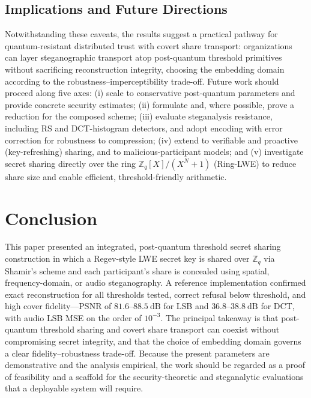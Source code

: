 \documentclass[preprint,12pt,number]{elsarticle}
\begin{document}
\subsection{Implications and Future Directions}

Notwithstanding these caveats, the results suggest a practical pathway for
quantum-resistant distributed trust with covert share transport: organizations
can layer steganographic transport atop post-quantum threshold primitives
without sacrificing reconstruction integrity, choosing the embedding domain
according to the robustness--imperceptibility trade-off. Future work should
proceed along five axes: (i) scale to conservative post-quantum parameters and
provide concrete security estimates; (ii) formulate and, where possible, prove
a reduction for the composed scheme; (iii) evaluate steganalysis resistance,
including RS and DCT-histogram detectors, and adopt encoding with error
correction for robustness to compression; (iv) extend to verifiable and
proactive (key-refreshing) sharing, and to malicious-participant models; and
(v) investigate secret sharing directly over the ring
$\mathbb{Z}_q[X]/(X^N+1)$ (Ring-LWE) to reduce share size and enable efficient,
threshold-friendly arithmetic.

\section{Conclusion}
\label{sec:conclusion}

This paper presented an integrated, post-quantum threshold secret sharing
construction in which a Regev-style LWE secret key is shared over
$\mathbb{Z}_q$ via Shamir's scheme and each participant's share is concealed
using spatial, frequency-domain, or audio steganography. A reference
implementation confirmed exact reconstruction for all thresholds tested,
correct refusal below threshold, and high cover fidelity---PSNR of
$81.6$--$88.5~\mathrm{dB}$ for LSB and $36.8$--$38.8~\mathrm{dB}$ for DCT, with
audio LSB MSE on the order of $10^{-3}$. The principal takeaway is that
post-quantum threshold sharing and covert share transport can coexist without
compromising secret integrity, and that the choice of embedding domain governs
a clear fidelity--robustness trade-off. Because the present parameters are
demonstrative and the analysis empirical, the work should be regarded as a
proof of feasibility and a scaffold for the security-theoretic and steganalytic
evaluations that a deployable system will require.
\end{document}
